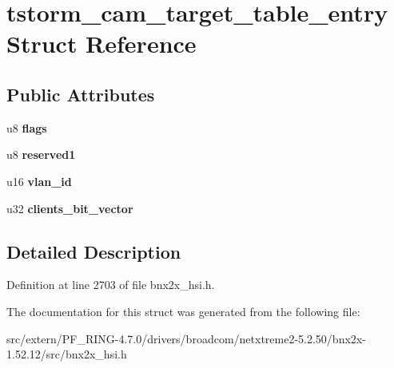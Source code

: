 \hypertarget{structtstorm__cam__target__table__entry}{
\section{tstorm\_\-cam\_\-target\_\-table\_\-entry Struct Reference}
\label{structtstorm__cam__target__table__entry}
}
\subsection*{Public Attributes}
\begin{DoxyCompactItemize}
\item 
\hypertarget{structtstorm__cam__target__table__entry_ad25e947694964e8c1e0821fd5c340d06}{
u8 {\bfseries flags}}
\label{structtstorm__cam__target__table__entry_ad25e947694964e8c1e0821fd5c340d06}

\item 
\hypertarget{structtstorm__cam__target__table__entry_abd30d4687b557762232ddacc86632f5c}{
u8 {\bfseries reserved1}}
\label{structtstorm__cam__target__table__entry_abd30d4687b557762232ddacc86632f5c}

\item 
\hypertarget{structtstorm__cam__target__table__entry_a457b7ef91e92698cd5382cf4ba910b38}{
u16 {\bfseries vlan\_\-id}}
\label{structtstorm__cam__target__table__entry_a457b7ef91e92698cd5382cf4ba910b38}

\item 
\hypertarget{structtstorm__cam__target__table__entry_a50c9a8d3e03b33593c8b12d4ae7d46c3}{
u32 {\bfseries clients\_\-bit\_\-vector}}
\label{structtstorm__cam__target__table__entry_a50c9a8d3e03b33593c8b12d4ae7d46c3}

\end{DoxyCompactItemize}


\subsection{Detailed Description}


Definition at line 2703 of file bnx2x\_\-hsi.h.



The documentation for this struct was generated from the following file:\begin{DoxyCompactItemize}
\item 
src/extern/PF\_\-RING-\/4.7.0/drivers/broadcom/netxtreme2-\/5.2.50/bnx2x-\/1.52.12/src/bnx2x\_\-hsi.h\end{DoxyCompactItemize}
